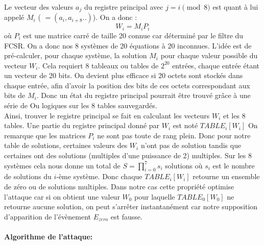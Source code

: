 \documentclass[11pt]{report}
\begin{document}
Le vecteur des valeurs $a_j$  du registre principal avec $j = i \pmod 8$ est quant à lui appelé $M_i$ ( $= (a_i,a_{i+8}..)$). On a donc : 
$$
W_i = M_iP_i
$$
où $P_i$ est une matrice carré de taille 20 connue car déterminé par le filtre du FCSR. 
On a donc nos 8 systèmes de 20 équations à 20 inconnues. 
L'idée est de pré-calculer, pour chaque système, la solution $M_i$ pour chaque valeur possible du vecteur $W_i$. Cela requiert 8 tableaux ou tables de $2^{20}$ entrées, chaque entrée étant un vecteur de 20 bits. On devient plus efficace si 20 octets sont stockés dans chaque entrée, afin d'avoir la position des bits de ces octets correspondant aux bits de $M_i$. Donc un état du registre principal pourrait être trouvé grâce à une série de Ou logiques sur les 8 tables sauvegardés. 
\\
Ainsi, trouver le registre principal se fait en calculant les vecteurs $W_i$ et les 8 tables. Une partie du registre principal donné par $W_i$ est noté $TABLE_i[W_i]$
On remarque que les matrices $P_i$ ne sont pas toute de rang plein. Donc pour notre table de solutions, certaines valeurs des $W_i$ n'ont pas de solution tandis que certaines ont des solutions (multiples d'une puissance de 2) multiples. Sur les 8 systèmes cela nous donne un total de $S=\prod_{i=0}^7 s_i$ solutions où $s_i$ est le nombre de solutions du $i$-ème système. Donc chaque $TABLE_i[W_i]$ retourne un ensemble de zéro ou de solutions multiples. Dans notre cas cette propriété optimise l'attaque car si on obtient une valeur $W_0$ pour laquelle $TABLE_0[W_0]$ ne retourne aucune solution, on peut s'arrêter instantanément car notre supposition d'apparition de l'évènement $E_{zero}$ est fausse. 
\\\\
\textbf{Algorithme de l'attaque:}
\\\\
\begin{algorithm}[H]
\end{algorithm}
\end{document}
